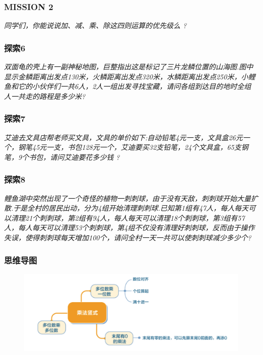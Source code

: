 \begin{frame}
    \frametitle{MISSION 2}
    \vspace*{-2cm}
    \textit{同学们，你能说说加、减、乘、除这四则运算的优先级么 ?}
\end{frame}

\begin{frame}
    \frametitle{探索6}
    \vspace*{-2cm}
    \textit{双面龟的壳上有一副神秘地图，巨整指出这是标记了三片龙鳞位置的山海图.图中显示金鳞距离出发点130米，火鳞距离出发点320米，水鳞距离出发点250米，小鲤鱼和它的小伙伴们一共6人，2人一组出发寻找宝藏，请问各组到达目的地时全组人一共走的路程是多少米?}
\end{frame}

\begin{frame}
    \frametitle{探索7}
    \vspace*{-2cm}
    \textit{艾迪去文具店帮老师买文具，文具的单价如下:自动铅笔4元一支，文具盒26元一个，钢笔45元一支，书包128元一个，艾迪要买32支铅笔，24个文具盒，65支钢笔，9个书包，请问艾迪要花多少钱 ?}
\end{frame}

\begin{frame}
    \frametitle{探索8}
    \vspace*{-2cm}
    \textit{鲤鱼湖中突然出现了一个奇怪的植物一刺刺球，由于没有天敌，刺刺球开始大量扩散.于是全村的居民出动，分为4组开始清理刺刺球.已知第1组有47人，每人每天可以清理21个刺刺球，第2组有94人，每人每天可以清理18个刺刺球，第3组有57人，每人每天可以清理53个刺刺球，第4组不仅没有清理好刺刺球，反而由于操作失误，使得刺刺球每天增加100个，请问全村一天一共可以使刺刺球减少多少个?}
\end{frame}

\begin{frame}
    \frametitle{思维导图}
    \begin{figure}[H] 
        \centering
        \includegraphics[width=1\textwidth]{./pics/Chapter_4/siweidaotu.png}
    \end{figure}
\end{frame}